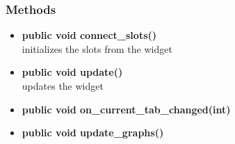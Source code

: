 \subsubsection{Methods}
\begin{itemize}
  \item \textbf{public void connect\_slots()}\\
  initializes the slots from the widget
  \item \textbf{public void update()}\\
  updates the widget
  \item \textbf{public void on\_current\_tab\_changed(int)}\\
  
  \item \textbf{public void update\_graphs()}\\
  
\end{itemize}

\newpage
